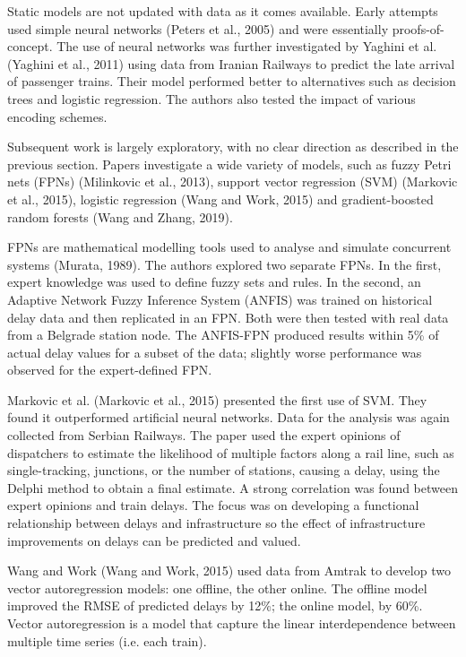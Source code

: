 \documentclass[12pt,a4paper]{article}
\begin{document}
Static models are not updated with data as it comes available. Early attempts used simple neural networks (Peters et al., 2005) and were essentially proofs-of-concept. The use of neural networks was further investigated by Yaghini et al. (Yaghini et al., 2011) using data from Iranian Railways to predict the late arrival of passenger trains. Their model performed better to alternatives such as decision trees and logistic regression. The authors also tested the impact of various encoding schemes. 

Subsequent work is largely exploratory, with no clear direction as described in the previous section. Papers investigate a wide variety of models, such as fuzzy Petri nets (FPNs) (Milinkovic et al., 2013), support vector regression (SVM) (Markovic et al., 2015), logistic regression (Wang and Work, 2015) and gradient-boosted random forests (Wang and Zhang, 2019).

FPNs are mathematical modelling tools used to analyse and simulate concurrent systems (Murata, 1989). The authors explored two separate FPNs. In the first, expert knowledge was used to define fuzzy sets and rules. In the second, an Adaptive Network Fuzzy Inference System (ANFIS) was trained on historical delay data and then replicated in an FPN. Both were then tested with real data from a Belgrade station node. The ANFIS-FPN produced results within 5\% of actual delay values for a subset of the data; slightly worse performance was observed for the expert-defined FPN.

Markovic et al. (Markovic et al., 2015) presented the first use of SVM. They found it outperformed artificial neural networks.  Data for the analysis was again collected from Serbian Railways. The paper used the expert opinions of dispatchers to estimate the likelihood of multiple factors along a rail line, such as single-tracking, junctions, or the number of stations, causing a delay, using the Delphi method to obtain a final estimate. A strong correlation was found between expert opinions and train delays. The focus was on developing a functional relationship between delays and infrastructure so the effect of infrastructure improvements on delays can be predicted and valued.  

Wang and Work (Wang and Work, 2015) used data from Amtrak to develop two vector autoregression models: one offline, the other online. The offline model improved the RMSE of predicted delays by 12\%; the online model, by 60\%. Vector autoregression is a model that capture the linear interdependence between multiple time series (i.e. each train). 
\end{document}
